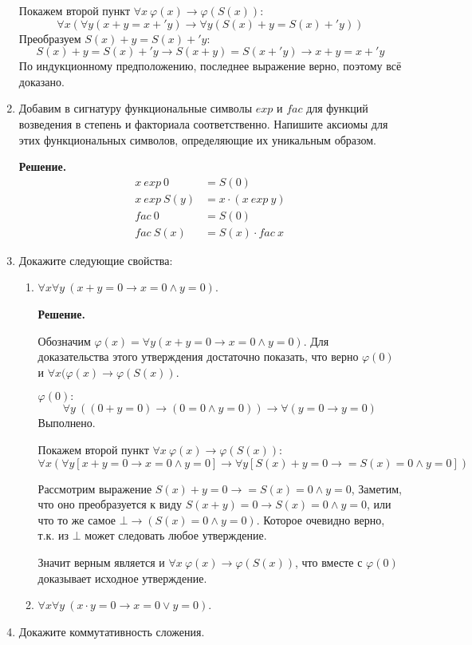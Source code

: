 \begin{enumerate}
Покажем второй пункт  $\forall x \ \varphi(x) \to \varphi(S(x))$:
\begin{equation*}
	\forall x (\forall y (x + y = x +' y) \to \forall y (S(x) + y = S(x) +' y))
\end{equation*}
Преобразуем $S(x) + y = S(x) +' y$:
\begin{equation*}
	S(x) + y = S(x) +' y \to S(x + y) = S(x +' y) \to x + y = x +' y
\end{equation*}
По индукционному предположению, последнее выражение верно, поэтому всё доказано.

\item Добавим в сигнатуру функциональные символы $exp$ и $fac$ для функций возведения в степень и факториала
соответственно.
    Напишите аксиомы для этих функциональных символов, определяющие их уникальным образом.

	\textbf{Решение.}
	\begin{align*}
		x \ exp \ 0 &= S(0)\\
		x \ exp \ S(y) &= x \cdot (x \ exp\ y) \\ 
		fac \ 0 &= S(0) \\
		fac \ S(x) &= S(x) \cdot fac\ x
	\end{align*}

\item Докажите следующие свойства:
\begin{enumerate}
\item $\forall x \forall y\ (x + y = 0 \to x = 0 \land y = 0)$.

\textbf{Решение.} 

Обозначим $\varphi(x) = \forall y (x + y = 0 \to x = 0 \land y = 0)$. Для доказательства этого утверждения 
достаточно показать, что верно $\varphi(0)$ и $\forall x (\varphi(x) \to \varphi(S(x))$.

$\varphi(0):$ 
\begin{equation*}
\forall y \ ((0 + y = 0) \to (0 = 0 \land y = 0)) \to \forall (y = 0 \to y = 0)
\end{equation*}
Выполнено.

Покажем второй пункт  $\forall x \ \varphi(x) \to \varphi(S(x))$:
\begin{equation*}
\forall x (\forall y [x + y = 0 \to x = 0 \land y = 0] \to \forall y [S(x) + y = 0 \to  = S(x) = 0 \land y = 0])
\end{equation*}

Рассмотрим выражение $S(x) + y = 0 \to  = S(x) = 0 \land y = 0$, Заметим, что оно преобразуется к виду $S(x + 
y) = 0 \to S(x) = 0 \land y = 0$, или что то же самое $\bot \to (S(x) = 0 \land y = 0)$. Которое очевидно 
верно, т.к. из $\bot$ может следовать любое утверждение. 

Значит верным является и $\forall x \ \varphi(x) \to \varphi(S(x))$, что вместе с $\varphi(0)$ доказывает 
исходное утверждение.

\item $\forall x \forall y\ (x \cdot y = 0 \to x = 0 \lor y = 0)$.
\end{enumerate}

\item Докажите коммутативность сложения.

\end{enumerate}

